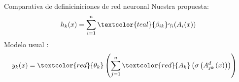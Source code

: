 \documentclass{beamer}
\begin{document}
\begin{frame}{Comparativa de definiciniciones de red neuronal}
    Nuestra propuesta: 
    \begin{align*}
                h_k(x) = 
                \sum_{i=1}^{n} \textcolor{teal}{\beta_{i k}} \gamma_{i}( A_{i}(x))
    \end{align*}
    Modelo usual \cite{MostafaLearningFromData}:
    \begin{align*}
        y_k(x) &= 
        \textcolor{red}{\theta_k}
        \left( 
            \sum^n_{j=1} \textcolor{red}{A_{k}}
            \left(
                \sigma 
                \left(
                    A^{d}_{j k}
                    \left(
                        x
                    \right)
                \right)
            \right)
        \right)
    \end{align*}
\end{frame}
\end{document}
